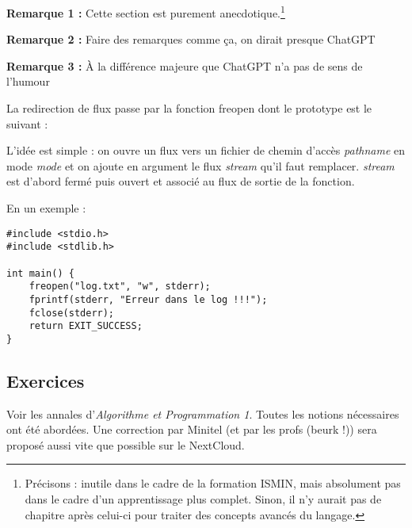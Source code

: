 \documentclass[../../../main.tex]{subfiles}
\begin{document}
\textbf{Remarque 1 :} Cette section est purement anecdotique.\footnote{Précisons : inutile dans le cadre de la formation ISMIN, mais absolument pas dans le cadre d'un apprentissage plus complet. Sinon, il n'y aurait pas de chapitre après celui-ci pour traiter des concepts avancés du langage.}
 
\textbf{Remarque 2 :} Faire des remarques comme ça, on dirait presque ChatGPT
 
\textbf{Remarque 3 :} À la différence majeure que ChatGPT n'a pas de sens de l'humour
 
La redirection de flux passe par la fonction \textsf{freopen} dont le prototype est le suivant :
\begin{center}
\end{center}
L'idée est simple : on ouvre un flux vers un fichier de chemin d'accès \textit{pathname} en mode \textit{mode} et on ajoute en argument le flux \textit{stream} qu'il faut remplacer. \textit{stream} est d'abord fermé puis ouvert et associé au flux de sortie de la fonction.
 
En un exemple :
\begin{verbatim}
#include <stdio.h>
#include <stdlib.h>

int main() {
	freopen("log.txt", "w", stderr);
	fprintf(stderr, "Erreur dans le log !!!");
	fclose(stderr);
	return EXIT_SUCCESS;
}
\end{verbatim}
\subsection{Exercices}
Voir les annales d'\textit{Algorithme et Programmation 1}. Toutes les notions nécessaires ont été abordées. Une correction par Minitel (et par les profs (beurk !)) sera proposé aussi vite que possible sur le NextCloud.
\end{document}
